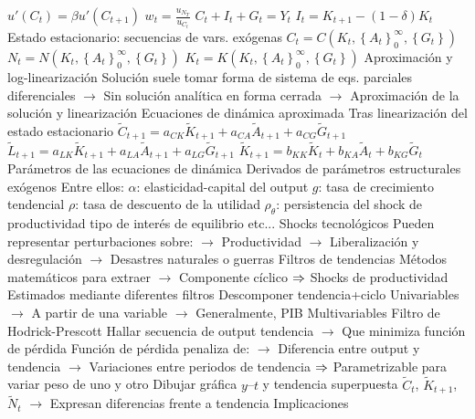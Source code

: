 \documentclass{nuevotema}
\begin{document}
\begin{esquemal}
				\4[] $u'(C_t) = \beta u'(C_{t+1})$
				\4[] $w_t = \frac{u_{N_T}}{u_{C_t}}$
				\4[] $C_t + I_t + G_t = Y_t$
				\4[] $I_t = K_{t+1} - (1-\delta) K_t$
				\4[$\then$] Estado estacionario: secuencias de vars. exógenas
				\4[] $C_t = C(K_t, \left\lbrace A_t \right\rbrace^\infty_0, \left\lbrace G_t \right\rbrace )$
				\4[] $N_t = N(K_t, \left\lbrace A_t \right\rbrace^\infty_0, \left\lbrace G_t \right\rbrace )$
				\4[] $K_t = K (K_t, \left\lbrace A_t \right\rbrace^\infty_0, \left\lbrace G_t \right\rbrace )$
				\4 Aproximación y log-linearización
				\4[] Solución suele tomar forma de
				\4[] sistema de eqs. parciales diferenciales
				\4[] $\to$ Sin solución analítica en forma cerrada
				\4[] $\to$ Aproximación de la solución y linearización
				\4 Ecuaciones de dinámica aproximada
				\4[] Tras linearización del estado estacionario
				\4[] $\tilde{C}_{t+1} = a_{CK}\tilde{K}_{t+1} + a_{CA}\tilde{A}_{t+1} + a_{CG} \tilde{G}_{t+1}$
				\4[] $\tilde{L}_{t+1} = a_{LK}\tilde{K}_{t+1} + a_{LA}\tilde{A}_{t+1} + a_{LG} \tilde{G}_{t+1}$
				\4[] $\tilde{K}_{t+1} = b_{KK}\tilde{K}_{t} + b_{KA}\tilde{A}_{t} + b_{KG} \tilde{G}_{t}$
				\4 Parámetros de las ecuaciones de dinámica
				\4[] Derivados de parámetros estructurales exógenos
				\4[] Entre ellos:
				\4[] $\alpha$: elasticidad-capital del output
				\4[] $g$: tasa de crecimiento tendencial
				\4[] $\rho$: tasa de descuento de la utilidad
				\4[] $\rho_\theta$: persistencia del shock de productividad
				\4[] tipo de interés de equilibrio
				\4[] etc...
				\4 Shocks tecnológicos
				\4[] Pueden representar perturbaciones sobre:
				\4[] $\to$  Productividad
				\4[] $\to$ Liberalización y desregulación
				\4[] $\to$ Desastres naturales o guerras
				\4 Filtros de tendencias
				\4[] Métodos matemáticos para extraer
				\4[] $\to$ Componente cíclico
				\4[] $\then$ Shocks de productividad
				\4 Estimados mediante diferentes filtros
				\4[] Descomponer tendencia+ciclo
				\4[] Univariables
				\4[] $\to$ A partir de una variable
				\4[] $\to$ Generalmente, PIB
				\4[] Multivariables
				\4 Filtro de Hodrick-Prescott
				\4[] Hallar secuencia de output tendencia
				\4[] $\to$ Que minimiza función de pérdida
				\4[] Función de pérdida penaliza de:
				\4[] $\to$ Diferencia entre output y tendencia
				\4[] $\to$ Variaciones entre periodos de tendencia
				\4[] $\then$ Parametrizable para variar peso de uno y otro
				\4[] Dibujar gráfica $y$--$t$ y tendencia superpuesta
				\4[] $\tilde{C}_t$, $\tilde{K}_{t+1}$, $\tilde{N}_t$
				\4[] $\to$ Expresan diferencias frente a tendencia
			\3 Implicaciones

\end{esquemal}
\end{document}
